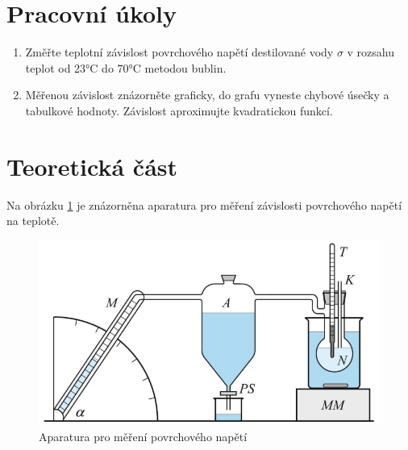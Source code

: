 \section{Pracovní úkoly}

\begin{enumerate}
\item Změřte teplotní závislost povrchového napětí destilované vody $\sigma$ v rozsahu teplot od 23°C do 70°C metodou bublin.

\item Měřenou závislost znázorněte graficky, do grafu vyneste chybové úsečky a tabulkové hodnoty. Závislost aproximujte kvadratickou funkcí.

\end{enumerate}

\section{Teoretická část}

Na obrázku \ref{fig:aparatura-povrchove-napeti} je znázorněna aparatura pro měření závislosti povrchového napětí na teplotě.

\begin{figure}[h]
    \centering
    \includegraphics[width=0.75\linewidth]{14 - Studium teplotní závislosti povrchového napětí//Protokol - studium povrchového napětí//img/Aparatura.png}
    \caption{Aparatura pro měření povrchového napětí}
    \label{fig:aparatura-povrchove-napeti}
\end{figure}

